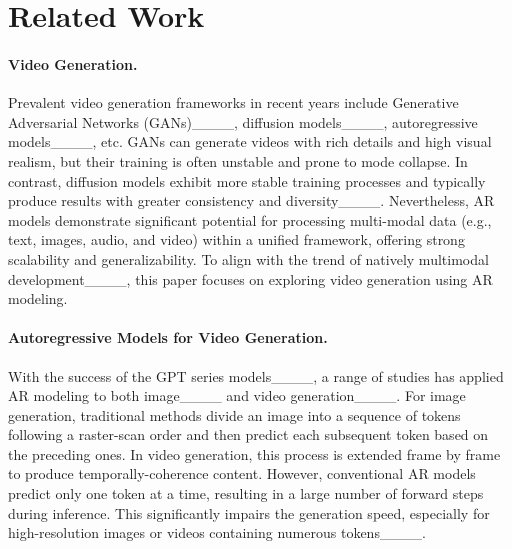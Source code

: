 \section{Related Work}
\paragraph{Video Generation.}
Prevalent video generation frameworks in recent years include Generative Adversarial Networks (GANs)____, diffusion models____, autoregressive models____, etc. 
GANs can generate videos with rich details and high visual realism, but their training is often unstable and prone to mode collapse. In contrast, diffusion models exhibit more stable training processes and typically produce results with greater consistency and diversity____. 
Nevertheless, AR models demonstrate significant potential for processing multi-modal data (e.g., text, images, audio, and video) within a unified framework, offering strong scalability and generalizability. To align with the trend of natively multimodal development____, this paper focuses on exploring video generation using AR modeling.

\paragraph{Autoregressive Models for Video Generation.}
With the success of the GPT series models____, a range of studies has applied AR modeling to both image____ and video generation____. 
For image generation, traditional methods divide an image into a sequence of tokens following a raster-scan order and then predict each subsequent token based on the preceding ones. In video generation, this process is extended frame by frame to produce temporally-coherence content. 
However, conventional AR models predict only one token at a time, resulting in a large number of forward steps during inference. This significantly impairs the generation speed, especially for high-resolution images or videos containing numerous tokens____.

